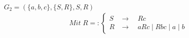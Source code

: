 $G_2=(\{a,b,c\},\{S,R\},S,R)$
\begin{align*}
	Mit\;R=:
	\begin{cases}
		S&\rightarrow\quad Rc\\
		R&\rightarrow\quad aRc\mid Rbc\mid a\mid b
	\end{cases}
\end{align*}